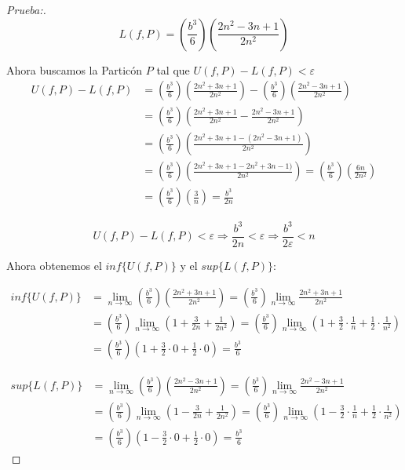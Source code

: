 \documentclass[12pt]{article}
\begin{document}
\begin{enumerate}[\hspace{9px} a)]
\begin{proof}[Prueba:]
            \[L(f,P)=\left(\frac{b^3}{6}\right)\left(\frac{2n^2-3n+1}{2n^2}\right)\]

            Ahora buscamos la Partic\'on $P$ tal que \(U(f,P)-L(f,P)<\varepsilon\)
            \begin{align*}
                U(f,P)-L(f,P) &= \left(\frac{b^3}{6}\right)\left(\frac{2n^2+3n+1}{2n^2}\right)-\left(\frac{b^3}{6}\right)\left(\frac{2n^2-3n+1}{2n^2}\right) \\
                &= \left(\frac{b^3}{6}\right)\left(\frac{2n^2+3n+1}{2n^2}-\frac{2n^2-3n+1}{2n^2}\right) \\
                &= \left(\frac{b^3}{6}\right)\left(\frac{2n^2+3n+1-(2n^2-3n+1)}{2n^2}\right) \\
                &= \left(\frac{b^3}{6}\right)\left(\frac{2n^2+3n+1-2n^2+3n-1)}{2n^2}\right) = \left(\frac{b^3}{6}\right)\left(\frac{6n}{2n^2}\right) \\
                &= \left(\frac{b^3}{6}\right)\left(\frac{3}{n}\right) = \frac{b^3}{2n}
            \end{align*}

            \begin{equation*}
                U(f,P)-L(f,P)<\varepsilon \Longrightarrow \frac{b^3}{2n}<\varepsilon \Longrightarrow \frac{b^3}{2\varepsilon}<n
            \end{equation*}\medskip

            Ahora obtenemos el \(inf\{U(f,P)\}\) y el \(sup\{L(f,P)\}\):

            \begin{align*}
                inf\{U(f,P)\} &= \lim_{n \to \infty}\left(\frac{b^3}{6}\right)\left(\frac{2n^2+3n+1}{2n^2}\right) = \left(\frac{b^3}{6}\right)\lim_{n \to \infty}\frac{2n^2+3n+1}{2n^2}\\
                &= \left(\frac{b^3}{6}\right)\lim_{n \to \infty}\left(1+\frac{3}{2n}+\frac{1}{2n^2}\right) = \left(\frac{b^3}{6}\right)\lim_{n \to \infty}\left(1+\frac{3}{2}\cdot\frac{1}{n}+\frac{1}{2}\cdot\frac{1}{n^2}\right)\\
                &= \left(\frac{b^3}{6}\right)\left(1+\frac{3}{2}\cdot0+\frac{1}{2}\cdot0\right) = \frac{b^3}{6}
            \end{align*}

            \begin{align*}
                sup\{L(f,P)\} &= \lim_{n \to \infty}\left(\frac{b^3}{6}\right)\left(\frac{2n^2-3n+1}{2n^2}\right) = \left(\frac{b^3}{6}\right)\lim_{n \to \infty}\frac{2n^2-3n+1}{2n^2}\\
                &= \left(\frac{b^3}{6}\right)\lim_{n \to \infty}\left(1-\frac{3}{2n}+\frac{1}{2n^2}\right) = \left(\frac{b^3}{6}\right)\lim_{n \to \infty}\left(1-\frac{3}{2}\cdot\frac{1}{n}+\frac{1}{2}\cdot\frac{1}{n^2}\right)\\
                &= \left(\frac{b^3}{6}\right)\left(1-\frac{3}{2}\cdot0+\frac{1}{2}\cdot0\right) = \frac{b^3}{6}
            \end{align*}


\end{proof}
\end{enumerate}
\end{document}
